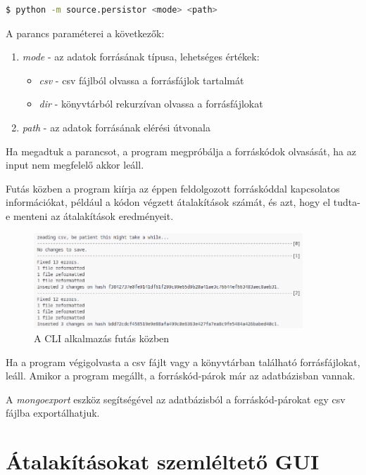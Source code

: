 \begin{lstlisting}[language=bash, numbers=none]
	$ python -m source.persistor <mode> <path>
\end{lstlisting}

A parancs paraméterei a következők:

\begin{enumerate}
	\item\label{step:first} \emph{mode} - az adatok forrásának típusa,
	lehetséges értékek:
	\begin{itemize}
		\item \emph{csv} - csv fájlból olvassa a forrásfájlok tartalmát
		\item \emph{dir} - könyvtárból rekurzívan olvassa a forrásfájlokat
	\end{itemize}
	\item \emph{path} - az adatok forrásának elérési útvonala
\end{enumerate}

Ha megadtuk a parancsot, a program megpróbálja a forráskódok olvasását,
ha az input nem megfelelő akkor leáll.

Futás közben a program kiírja az éppen feldolgozott forráskóddal kapcsolatos információkat,
például a kódon végzett átalakítások számát, és azt, hogy el tudta-e menteni az átalakítások eredményeit.

\begin{figure}[H]
	\centering
	\includegraphics[width=0.9\textwidth,frame]{images/screenshots/log.png}
	\caption{A CLI alkalmazás futás közben}
\end{figure}

Ha a program végigolvasta a csv fájlt vagy a könyvtárban található forrásfájlokat, leáll.
Amikor a program megállt, a forráskód-párok már az adatbázisban vannak.

A \emph{mongoexport} eszköz segítségével
az adatbázisból a forráskód-párokat egy csv fájlba exportálhatjuk.

\section{Átalakításokat szemléltető GUI}

